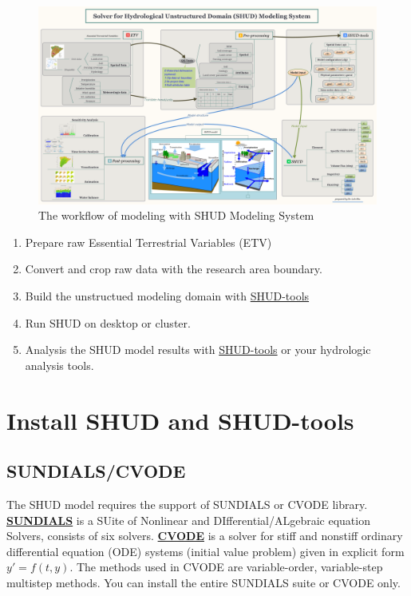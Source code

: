 \documentclass[]{scrbook}
\providecommand{\tightlist}{%
  \setlength{\itemsep}{0pt}\setlength{\parskip}{0pt}}
\begin{document}
\begin{figure}
\centering
\includegraphics{./Fig/autoSHUD.png}
\caption{The workflow of modeling with SHUD Modeling System}
\end{figure}

\begin{enumerate}
\def\labelenumi{\arabic{enumi}.}
\tightlist
\item
  Prepare raw Essential Terrestrial Variables (ETV)
\item
  Convert and crop raw data with the research area boundary.
\item
  Build the unstructued modeling domain with
  \href{https://github.com/SHUD-System/SHUD-tools}{SHUD-tools}
\item
  Run SHUD on desktop or cluster.
\item
  Analysis the SHUD model results with
  \href{https://github.com/SHUD-System/SHUD-tools}{SHUD-tools} or your
  hydrologic analysis tools.
\end{enumerate}

\chapter{Install SHUD and SHUD-tools}\label{install-shud-and-shud-tools}

\section{SUNDIALS/CVODE}\label{sundialscvode}

The SHUD model requires the support of SUNDIALS or CVODE library.
\href{https://computation.llnl.gov/projects/sundials}{\textbf{SUNDIALS}}
is a SUite of Nonlinear and DIfferential/ALgebraic equation Solvers,
consists of six solvers.
\href{https://computation.llnl.gov/projects/sundials/cvode}{\textbf{CVODE}}
is a solver for stiff and nonstiff ordinary differential equation (ODE)
systems (initial value problem) given in explicit form \(y' = f(t,y)\).
The methods used in CVODE are variable-order, variable-step multistep
methods. You can install the entire SUNDIALS suite or CVODE only.
\end{document}
